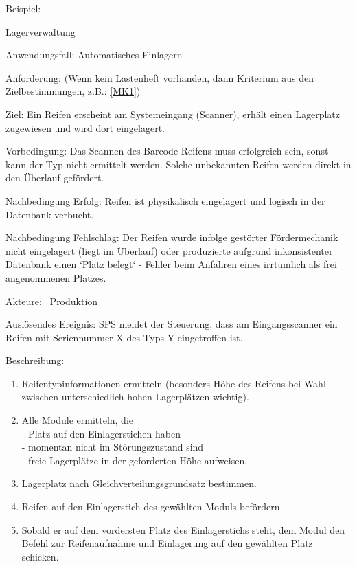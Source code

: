 Beispiel:\\
\begin{function}{10}{Lagerverwaltung}
    \item[Anwendungsfall:] Automatisches Einlagern
    \item[Anforderung:]  (Wenn kein Lastenheft vorhanden, dann Kriterium aus den Zielbestimmungen, z.B.: \ref{MK1})
    \item[Ziel:] Ein Reifen erscheint am Systemeingang (Scanner), erhält einen Lagerplatz
    zugewiesen und wird dort eingelagert.
    \item[Vorbedingung:] Das Scannen des Barcode-Reifens muss erfolgreich sein, sonst kann
    der Typ nicht ermittelt werden.
    Solche unbekannten Reifen werden direkt in den
    Überlauf gefördert.
    \item[Nachbedingung Erfolg:] Reifen ist physikalisch eingelagert und logisch in der
    Datenbank verbucht.
    \item[Nachbedingung Fehlschlag:] Der Reifen wurde infolge gestörter Fördermechanik
    nicht eingelagert (liegt im Überlauf) oder produzierte aufgrund inkonsistenter
    Datenbank einen `Platz belegt` - Fehler beim Anfahren eines irrtümlich
    als frei angenommenen Platzes.
    \item[Akteure:] ~Produktion
    \item[Auslösendes Ereignis:] SPS meldet der Steuerung, dass am Eingangsscanner ein
    Reifen mit Seriennummer X des Typs Y eingetroffen ist.
    \item[Beschreibung:] ~
    \begin{enumerate}
      \item Reifentypinformationen ermitteln (besonders Höhe des Reifens bei Wahl zwischen unterschiedlich hohen Lagerplätzen wichtig).
      \item Alle Module ermitteln, die\\
    - Platz auf den Einlagerstichen haben\\
    - momentan nicht im Störungszustand sind\\
    -  freie Lagerplätze in der geforderten Höhe aufweisen.
      \item Lagerplatz nach Gleichverteilungsgrundsatz bestimmen.
      \item Reifen auf den Einlagerstich des gewählten Moduls befördern.
      \item Sobald er auf dem vordersten Platz des Einlagerstichs steht, dem Modul den Befehl zur Reifenaufnahme und Einlagerung auf den gewählten Platz schicken.

\end{enumerate}
\end{function}
